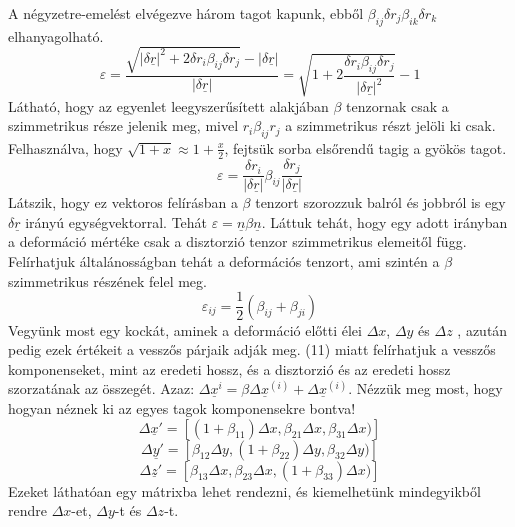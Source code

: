 \documentclass[a4paper,12pt]{article}
\begin{document}
A négyzetre-emelést elvégezve három tagot kapunk, ebből $\beta_{ij}\delta r_j\beta_{ik}\delta r_k$ elhanyagolható.
\begin{equation}
\varepsilon=\frac{\sqrt{|\delta\underline{r}|^2+2\delta r_i\beta_{ij}\delta r_j}-|\delta\underline{r}|}{|\delta\underline{r}|}=\sqrt{1+2\frac{\delta r_i\beta_{ij}\delta r_j}{|\delta\underline{r}|^2}}-1
\end{equation}
Látható, hogy az egyenlet leegyszerűsített alakjában $\beta$ tenzornak csak a szimmetrikus része jelenik meg, mivel $r_i\beta_{ij}r_j$ a szimmetrikus részt jelöli ki csak. Felhasználva, hogy $\sqrt{1+x}\approx 1+\frac{x}{2}$, fejtsük sorba elsőrendű tagig a gyökös tagot.
\begin{equation}
\varepsilon=\frac{\delta r_i}{|\delta\underline{r}|}\beta_{ij}\frac{\delta r_j}{|\delta\underline{r}|}
\end{equation}
Látszik, hogy ez vektoros felírásban a $\beta$ tenzort szorozzuk balról és jobbról is egy $\delta\underline{r}$ irányú egységvektorral. Tehát $\varepsilon=\underline{n}\beta\underline{n}$. Láttuk tehát, hogy egy adott irányban a deformáció mértéke csak a disztorzió tenzor szimmetrikus elemeitől függ. Felírhatjuk általánosságban tehát a deformációs tenzort, ami szintén a $\beta$ szimmetrikus részének felel meg.
\begin{equation}
\varepsilon_{ij}=\frac{1}{2}(\beta_{ij}+\beta_{ji})
\end{equation}
Vegyünk most egy kockát, aminek a deformáció előtti élei $\Delta x$, $\Delta y$ és $\Delta z$ , azután pedig ezek értékeit a vesszős párjaik adják meg. (11) miatt felírhatjuk a vesszős komponenseket, mint az eredeti hossz, és a disztorzió és az eredeti hossz szorzatának az összegét. Azaz: $\Delta \underline{x}^{i}=\beta \Delta \underline{x}^{(i)}+\Delta \underline{x}^{(i)}$. Nézzük meg most, hogy hogyan néznek ki az egyes tagok komponensekre bontva!
\begin{equation}
\Delta\underline{x}'=\left[(1+\beta_{11})\Delta x, \beta_{21}\Delta x, \beta_{31}\Delta x)\right]
\end{equation}
\begin{equation}
\Delta\underline{y}'=\left[\beta_{12}\Delta y, (1+\beta_{22})\Delta y, \beta_{32}\Delta y)\right]
\end{equation}
\begin{equation}
\Delta\underline{z}'=\left[\beta_{13}\Delta x, \beta_{23}\Delta x, (1+\beta_{33})\Delta x)\right]
\end{equation}
Ezeket láthatóan egy mátrixba lehet rendezni, és kiemelhetünk mindegyikből rendre $\Delta x$-et, $\Delta y$-t és $\Delta z$-t.
\end{document}
